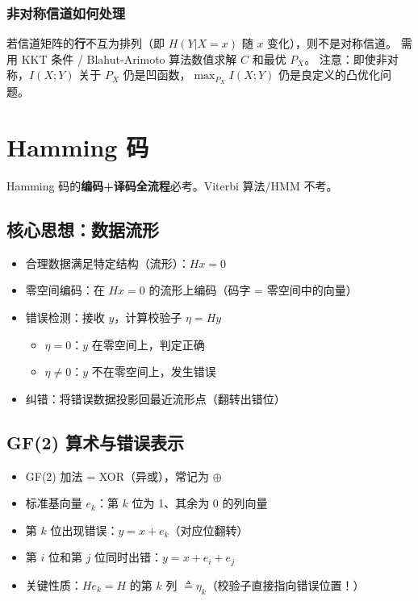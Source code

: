 \documentclass[12pt,a4paper]{ctexart}
\theoremstyle{definition}
\begin{document}
\subsubsection{非对称信道如何处理}

若信道矩阵的\textbf{行}不互为排列（即 $H(Y|X=x)$ 随 $x$ 变化），则不是对称信道。
需用 KKT 条件 / Blahut-Arimoto 算法数值求解 $C$ 和最优 $P_X$。
注意：即使非对称，$I(X;Y)$ 关于 $P_X$ 仍是凹函数，$\max_{P_X} I(X;Y)$ 仍是良定义的凸优化问题。

\section{Hamming 码}

\begin{keybox}[考试范围]
Hamming 码的\textbf{编码+译码全流程}必考。Viterbi 算法/HMM 不考。
\end{keybox}

\subsection{核心思想：数据流形}

\begin{itemize}[nosep]
  \item 合理数据满足特定结构（流形）：$Hx = 0$
  \item 零空间编码：在 $Hx = 0$ 的流形上编码（码字 = 零空间中的向量）
  \item 错误检测：接收 $y$，计算校验子 $\eta = Hy$
  \begin{itemize}[nosep]
    \item $\eta = 0$：$y$ 在零空间上，判定正确
    \item $\eta \neq 0$：$y$ 不在零空间上，发生错误
  \end{itemize}
  \item 纠错：将错误数据投影回最近流形点（翻转出错位）
\end{itemize}

\subsection{GF(2) 算术与错误表示}

\begin{itemize}[nosep]
  \item GF(2) 加法 = XOR（异或），常记为 $\oplus$
  \item 标准基向量 $e_k$：第 $k$ 位为 1、其余为 0 的列向量
  \item 第 $k$ 位出现错误：$y = x + e_k$（对应位翻转）
  \item 第 $i$ 位和第 $j$ 位同时出错：$y = x + e_i + e_j$
  \item 关键性质：$He_k = H$ 的第 $k$ 列 $\triangleq \eta_k$（校验子直接指向错误位置！）
\end{itemize}
\end{document}
